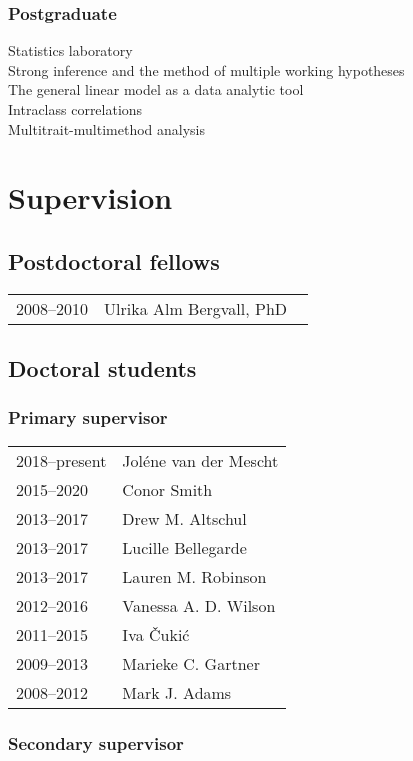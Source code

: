 \documentclass[11pt]{article}
\begin{document}
\subsubsection*{Postgraduate}
Statistics laboratory \\
Strong inference and the method of multiple working hypotheses \\
The general linear model as a data analytic tool \\
Intraclass correlations \\
Multitrait-multimethod analysis

\section*{Supervision}
\subsection*{Postdoctoral fellows}

\begin{tabular}{p{3cm}p{12cm}}
2008--2010 & Ulrika Alm Bergvall, PhD \
\end{tabular}

\subsection*{Doctoral students}

\subsubsection*{Primary supervisor}
\begin{tabular}{p{3cm}p{12cm}}
2018--present & Joléne van der Mescht \\
2015--2020 & Conor Smith \\
2013--2017 & Drew M. Altschul \\
2013--2017 & Lucille Bellegarde \\
2013--2017 & Lauren M. Robinson \\
2012--2016 & Vanessa A. D. Wilson \\
2011--2015 & Iva Čukić \\
2009--2013 & Marieke C. Gartner \\
2008--2012 & Mark J. Adams
\end{tabular}

\subsubsection*{Secondary supervisor}
\end{document}
